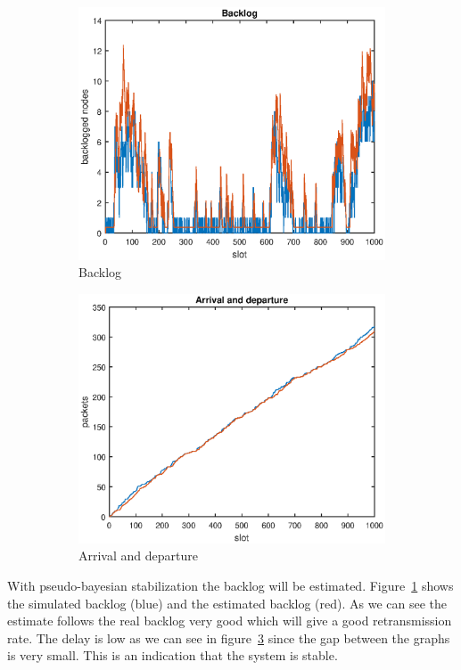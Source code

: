 \documentclass{article}
\begin{document}
\begin{figure}[h]
  \begin{subfigure}{.5\textwidth}
    \includegraphics[width=\textwidth]{figures/backlog-stabilized.eps}
    \caption{Backlog}
    \label{fig:backlog-stabilized}
  \end{subfigure}%
  \begin{subfigure}{.5\textwidth}
    \includegraphics[width=\textwidth]{figures/arrival-departure-stabilized.eps}
    \caption{Arrival and departure}
    \label{fig:arrival-departure-stabilized}
  \end{subfigure}
  \caption{}
\end{figure}

With pseudo-bayesian stabilization the backlog will be estimated. Figure~\ref{fig:backlog-stabilized} shows the simulated backlog (blue) and the estimated backlog (red). As we can see the estimate follows the real backlog very good which will give a good retransmission rate. The delay is low as we can see in figure~\ref{fig:arrival-departure-stabilized} since the gap between the graphs is very small. This is an indication that the system is stable.
\end{document}
